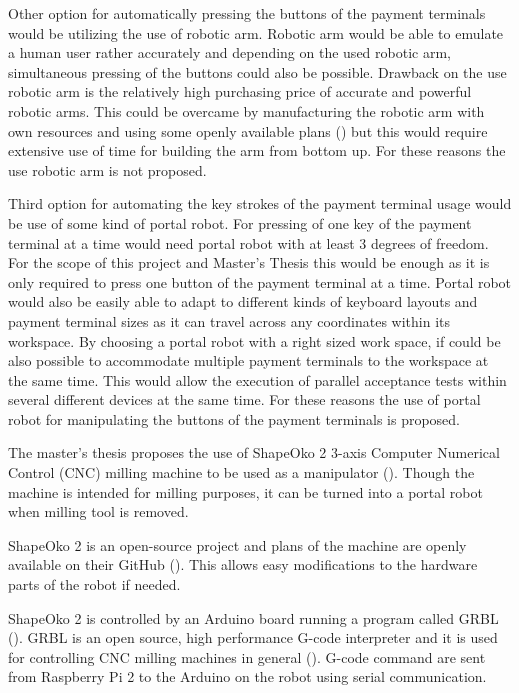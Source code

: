Other option for automatically pressing the buttons of the payment terminals would be utilizing the use of robotic arm. Robotic arm would be able to emulate a human user rather accurately and depending on the used robotic arm, simultaneous pressing of the buttons could also be possible. Drawback on the use robotic arm is the relatively high purchasing price of accurate and powerful robotic arms. This could be overcame by manufacturing the robotic arm with own resources and using some openly available plans (\emph{\cite{bcn3d}}) but this would require extensive use of time for building the arm from bottom up. For these reasons the use robotic arm is not proposed.

Third option for automating the key strokes of the payment terminal usage would be use of some kind of portal robot. For pressing of one key of the payment terminal at a time would need portal robot with at least 3 degrees of freedom. For the scope of this project and Master's Thesis this would be enough as it is only required to press one button of the payment terminal at a time. Portal robot would also be easily able to adapt to different kinds of keyboard layouts and payment terminal sizes as it can travel across any coordinates within its workspace. By choosing a portal robot with a right sized work space, if could be also possible to accommodate multiple payment terminals to the workspace at the same time. This would allow the execution of parallel acceptance tests within several different devices at the same time. For these reasons the use of portal robot for manipulating the buttons of the payment terminals is proposed.

The master's thesis proposes the use of ShapeOko 2 3-axis Computer Numerical Control (CNC) milling machine to be used as a manipulator (\emph{\cite{shapeoko}}). Though the machine is intended for milling purposes, it can be turned into a portal robot when milling tool is removed.

ShapeOko 2 is an open-source project and plans of the machine are openly available on their GitHub (\emph{\cite{shapeoko_git}}). This allows easy modifications to the hardware parts of the robot if needed.

ShapeOko 2 is controlled by an Arduino board running a program called GRBL (\emph{\cite{grbl}}). GRBL is an open source, high performance G-code interpreter and it is used for controlling CNC milling machines in general (\emph{\cite{shapeoko}}). G-code command are sent from Raspberry Pi 2 to the Arduino on the robot using serial communication.


